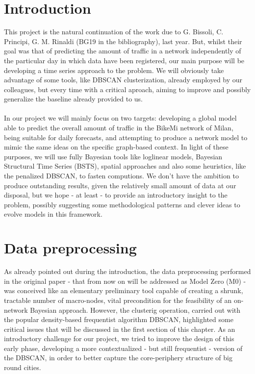 \documentclass[11pt,twoside]{report}
\begin{document}
\pagestyle{fancy}
\fancyhf{}
\fancyhead{}
\fancyfoot{}
\fancyfoot[C,C]{\thepage}
\renewcommand{\headrulewidth}{0.4pt}

\tableofcontents{}

\chapter*{Introduction}
This project is the natural continuation of the work due to G. Bissoli, C. Principi, G. M. Rinaldi (BG19 in the bibliography), last year. But, whilst their goal was that of predicting the amount of traffic in a network independently of the particular day in which data have been registered, our main purpose will be developing a time series approach to the problem. We will obviously take advantage of some tools, like DBSCAN clusterization, already employed by our colleagues, but every time with a critical aproach, aiming to improve and possibly generalize the baseline already provided to us.\\
\\
In our project we will mainly focus on two targets: developing a global model able to predict the overall amount of traffic in the BikeMi network of Milan, being suitable for daily forecasts, and attempting to produce a network model to mimic the same ideas on the specific graph-based context. In light of these purposes, we will use fully Bayesian tools like loglinear models, Bayesian Structural Time Series (BSTS), spatial approaches and also some heuristics, like the penalized DBSCAN, to fasten computions. We don't have the ambition to produce outstanding results, given the relatively small amount of data at our disposal, but we hope - at least - to provide an introductory insight to the problem, possibly suggesting some methodological patterns and clever ideas to evolve models in this framework.

\chapter{Data preprocessing}
As already pointed out during the introduction, the data preprocessing performed in the original paper - that from now on will be addressed as Model Zero (M0) - was conceived like an elementary preliminary tool capable of creating a shrunk, tractable number of macro-nodes, vital precondition for the feasibility of an on-network Bayesian approach. However, the clusterig operation, carried out with the popular density-based frequentist algorithm DBSCAN, highlighted some critical issues that will be discussed in the first section of this chapter. As an introductory challenge for our project, we tried to improve the design of this early phase, developing a more contextualized - but still frequentist - version of the DBSCAN, in order to better capture the core-periphery structure of big round cities.
\end{document}
